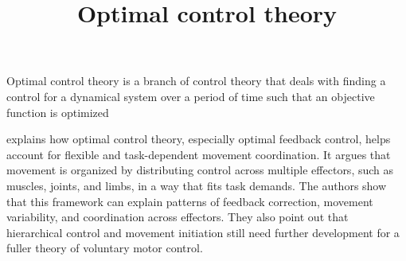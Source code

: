 \documentclass[a4paper]{article}
\title{Optimal control theory}
\date{}
\begin{document}
    \maketitle
     Optimal control theory is a branch of control theory that deals with finding a control for a dynamical system over a period of time such that an objective function is optimized
    
    \cite{diedrichsen-2009-the-coordination-of-movement-optimal-feedback-control-and-beyond} explains how optimal control theory, especially optimal feedback control, helps account for flexible and task-dependent movement coordination. It argues that movement is organized by distributing control across multiple effectors, such as muscles, joints, and limbs, in a way that fits task demands.
    The authors show that this framework can explain patterns of feedback correction, movement variability, and coordination across effectors. They also point out that hierarchical control and movement initiation still need further development for a fuller theory of voluntary motor control.
    
    
\end{document}
